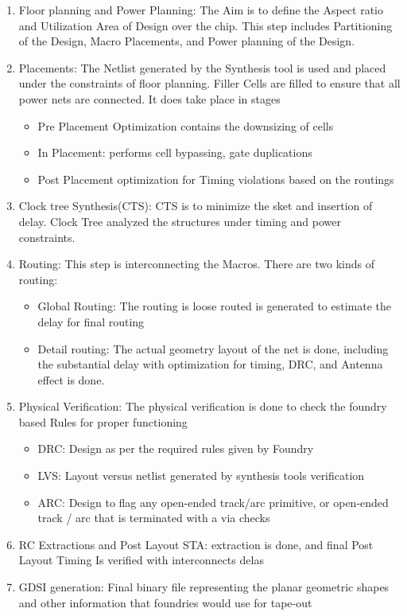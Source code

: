 \begin{enumerate}
    \item Floor planning and Power Planning: The Aim is to define the Aspect ratio and Utilization Area of Design over the chip. This step includes Partitioning of the Design, Macro Placements, and Power planning of the Design.

    \item Placements: The Netlist generated by the Synthesis tool is used and placed under the constraints of floor planning. Filler Cells are filled to ensure that all power nets are connected. It does take place in stages
    \begin{itemize}
        \item Pre Placement Optimization contains the downsizing of cells
        \item In Placement: performs cell bypassing, gate duplications 
        \item Post Placement optimization for Timing violations based on the routings
    \end{itemize}

    \item Clock tree Synthesis(CTS): CTS is to minimize the sket and insertion of delay. Clock Tree analyzed the structures under timing and power constraints.

    \item Routing: This step is interconnecting the Macros. There are two kinds of routing:
    \begin{itemize}
    \item  Global Routing: The routing is loose routed is generated to estimate the delay for final routing
    \item Detail routing: The actual geometry layout of the net is done, including the substantial delay with optimization for timing, DRC, and Antenna effect is done.
    \end{itemize}
    
    \item Physical Verification: The physical verification is done to check the foundry based Rules for proper functioning
    \begin{itemize}
    \item DRC: Design as per the required rules given by Foundry
    \item LVS: Layout versus netlist generated by synthesis tools verification
    \item ARC: Design to flag any open-ended track/arc primitive, or open-ended track / arc that is terminated with a via checks
    \end{itemize}

    \item RC Extractions and Post Layout STA: extraction is done, and final Post Layout Timing Is verified with interconnects delas

    \item GDSI generation: Final binary file representing the planar geometric shapes and other information that foundries would use for tape-out
\end{enumerate}